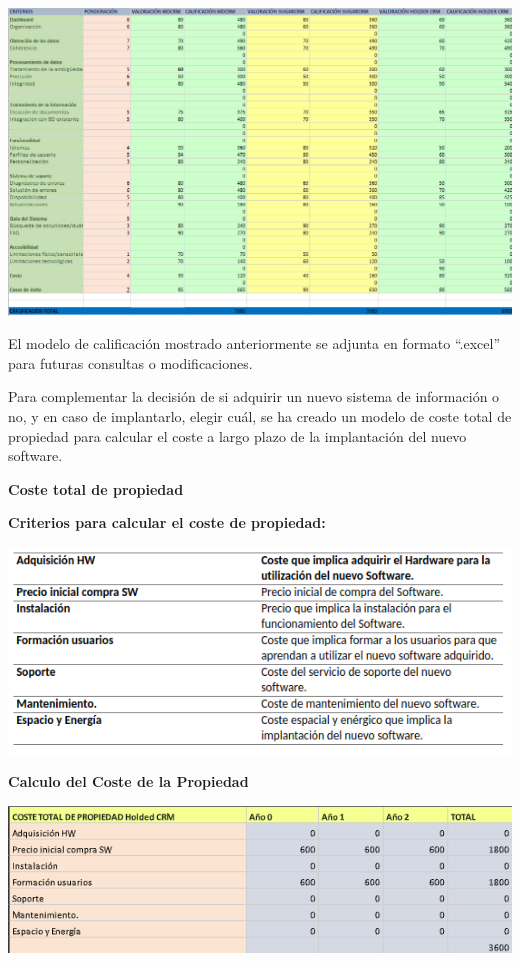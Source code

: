 \documentclass{article}
\begin{document}
\begin{center}
\includegraphics[scale=0.5]{images/ponderacion.png}
\end{center}

El modelo de calificación mostrado anteriormente se adjunta en formato “.excel” para futuras consultas o modificaciones. 

Para complementar la decisión de si adquirir un nuevo sistema de información o no, y en caso de implantarlo, elegir cuál, se ha creado un modelo de coste total de propiedad para calcular el coste a largo plazo de la implantación del nuevo software. 

\textbf{Coste total de propiedad}

\textbf{Criterios para calcular el coste de propiedad:}

\begin{center}
\includegraphics[scale=0.5]{images/costePropiedad.png}
\end{center}

\textbf{Calculo del Coste de la Propiedad}

\begin{center}
\includegraphics[scale=0.5]{images/Holded.png}
\end{center}
\end{document}
